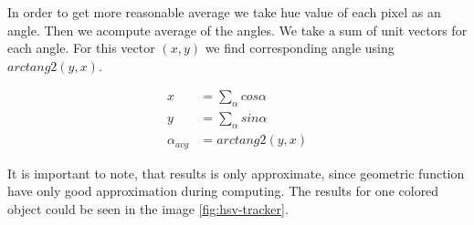 In order to get more reasonable average we take hue value of each pixel as an
angle. Then we acompute average of the angles.  We take a sum of unit vectors
for each angle. For this vector $(x, y)$ we find corresponding angle using
$arctang2(y, x)$.

$$
\begin{aligned}
x &= \sum_\alpha cos \alpha \\
y &= \sum_\alpha sin \alpha \\
\alpha_{avg} &= arctang2(y, x)
\end{aligned}
$$

It is important to note, that results is only approximate, since geometric
function have only good approximation during computing. The results for one
colored object could be seen in the image \ref{fig:hsv-tracker}.

